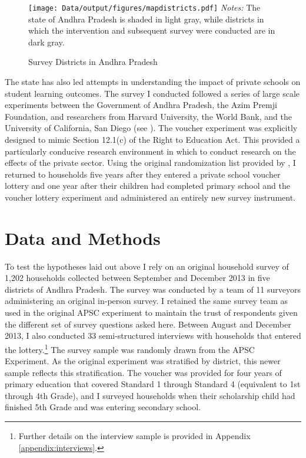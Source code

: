\documentclass[hidelinks, 12pt, titlepage]{article}
\begin{document}
	\begin{figure}[htbp]
		\caption{Survey Districts in Andhra Pradesh\label{fig:apmap}}
		\centering
		\begin{minipage}{5.5in}
			\texttt{[image: Data/output/figures/mapdistricts.pdf]}
			\footnotesize
			\emph{Notes:} The state of Andhra Pradesh is shaded in light gray, while districts in which the intervention and subsequent survey were conducted are in dark gray.
		\end{minipage}
	\end{figure}

	The state has also led attempts in understanding the impact of private schools on student learning outcomes.  The survey I conducted followed a series of large scale experiments between the Government of Andhra Pradesh, the Azim Premji Foundation, and researchers from Harvard University, the World Bank, and the University of California, San Diego (see \cite{Muralidharan2011,Muralidharan2011a,Muralidharan2015}).  The voucher experiment was explicitly designed to mimic Section 12.1(c) of the Right to Education Act.  This provided a particularly conducive research environment in which to conduct research on the effects of the private sector.	Using the original randomization list provided by \cite{Muralidharan2015}, I returned to households five years after they entered a private school voucher lottery and one year after their children had completed primary school and the voucher lottery experiment and administered an entirely new survey instrument.

\section*{Data and Methods\label{section:dataandmethods}}

	To test the hypotheses laid out above I rely on an original household survey of 1,202 households collected between September and December 2013 in five districts of Andhra Pradesh.  The survey was conducted by a team of 11 surveyors administering an original in-person survey.  I retained the same survey team as used in the original APSC experiment to maintain the trust of respondents given the different set of survey questions asked here.  Between August and December 2013, I also conducted 33 semi-structured interviews with households that entered the lottery.\footnote{Further details on the interview sample is provided in Appendix \ref{appendix:interviews}.}  The survey sample was randomly drawn from the APSC Experiment. As the original experiment was stratified by district, this newer sample reflects this stratification.   The voucher was provided for four years of primary education that covered Standard 1 through Standard 4 (equivalent to 1st through 4th Grade), and I surveyed households when their scholarship child had finished 5th Grade and was entering secondary school.
\end{document}
